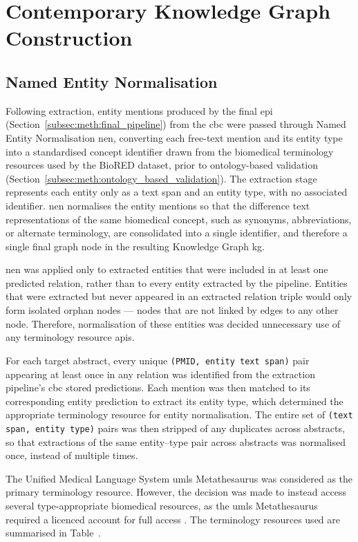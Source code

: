 \section{Contemporary Knowledge Graph Construction}
\label{sec:meth:contemporary_kg_construction}

\subsection{Named Entity Normalisation}
\label{subsec:meth:named_entity_normalisation}
Following extraction, entity mentions produced by the final \gls{epi} (Section~\ref{subsec:meth:final_pipeline}) from the \gls{cbc} were passed through Named Entity Normalisation \gls{nen}, converting each free-text mention and its entity type into a standardised concept identifier drawn from the biomedical terminology resources used by the BioRED dataset, prior to ontology-based validation (Section~\ref{subsec:meth:ontology_based_validation}). The extraction stage represents each entity only as a text span and an entity type, with no associated identifier. \gls{nen} normalises the entity mentions so that the difference text representations of the same biomedical concept, such as synonyms, abbreviations, or alternate terminology, are consolidated into a single identifier, and therefore a single final graph node in the resulting Knowledge Graph \gls{kg}.

\gls{nen} was applied only to extracted entities that were included in at least one predicted relation, rather than to every entity extracted by the pipeline. Entities that were extracted but never appeared in an extracted relation triple would only form isolated orphan nodes --- nodes that are not linked by edges to any other node. Therefore, normalisation of these entities was decided unnecessary use of any terminology resource \glspl{api}.

For each target abstract, every unique \texttt{(PMID, entity text span)} pair appearing at least once in any relation was identified from the extraction pipeline's \gls{cbc} stored predictions. Each mention was then matched to its corresponding entity prediction to extract its entity type, which determined the appropriate terminology resource for entity normalisation. The entire set of \texttt{(text span, entity type)} pairs was then stripped of any duplicates across abstracts, so that extractions of the same entity--type pair across abstracts was normalised once, instead of multiple times.

The Unified Medical Language System \gls{umls} Metathesaurus was considered as the primary terminology resource. However, the decision was made to instead access several type-appropriate biomedical resources, as the \gls{umls} Metathesaurus required a licenced account for full access \dep. The terminology resources used are summarised in Table~\pref.


